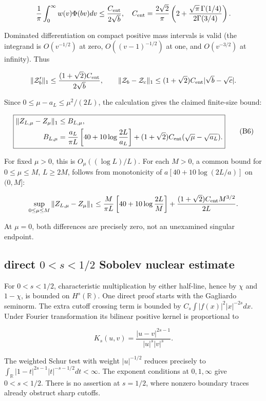 \documentclass[
  10pt,
  a4paper,
]{article}
\begin{document}
\[
\frac1\pi\int_0^\infty w(v)\Phi(bv)dv\le\frac{C_{\rm ent}}{2\sqrt b},\quad
C_{\rm ent}=\frac{2\sqrt2}{\pi}\left(2+\frac{\sqrt\pi\,\Gamma(1/4)}{2\Gamma(3/4)}\right).
\]

Dominated differentiation on compact positive mass intervals is valid (the integrand is \(O(v^{-1/2})\) at zero, \(O((v-1)^{-1/2})\) at one, and \(O(v^{-3/2})\) at infinity). Thus

\[
\|\mathcal Z_b'\|_1\le\frac{(1+\sqrt2)C_{\rm ent}}{2\sqrt b},\qquad
\|\mathcal Z_b-\mathcal Z_c\|_1\le(1+\sqrt2)C_{\rm ent}|\sqrt b-\sqrt c|.
\]

Since \(0\le\mu-a_L\le\mu^2/(2L)\), the calculation gives the claimed finite-size bound:

\[
\boxed{\begin{aligned}
\|Z_{L,\mu}-Z_\mu\|_1&\le B_{L,\mu},\\
B_{L,\mu}&=\frac{a_L}{\pi L}\left[40+10\log\frac{2L}{a_L}\right]
+(1+\sqrt2)C_{\rm ent}(\sqrt\mu-\sqrt{a_L}).
\end{aligned}}\tag{B6}
\]

For fixed \(\mu>0\), this is \(O_\mu((\log L)/L)\). For each \(M>0\), a common bound for \(0\le\mu\le M\), \(L\ge2M\), follows from monotonicity of \(a[40+10\log(2L/a)]\) on \((0,M]\):

\[
\sup_{0\le\mu\le M}\|Z_{L,\mu}-Z_\mu\|_1
\le\frac{M}{\pi L}\left[40+10\log\frac{2L}{M}\right]
+\frac{(1+\sqrt2)C_{\rm ent}M^{3/2}}{2L}.
\]

At \(\mu=0\), both differences are precisely zero, not an unexamined singular endpoint.

\subsection{\texorpdfstring{direct \(0<s<1/2\) Sobolev nuclear estimate}{direct 0\textless s\textless1/2 Sobolev nuclear estimate}}\label{direct-0s12-sobolev-nuclear-estimate}

For \(0<s<1/2\), characteristic multiplication by either half-line, hence by \(\chi\) and \(1-\chi\), is bounded on \(H^s(\mathbb R)\). One direct proof starts with the Gagliardo seminorm. The extra cutoff crossing term is bounded by \(C_s\int|f(x)|^2|x|^{-2s}dx\). Under Fourier transformation its bilinear positive kernel is proportional to

\[
K_s(u,v)=\frac{|u-v|^{2s-1}}{|u|^s|v|^s}.
\]

The weighted Schur test with weight \(|u|^{-1/2}\) reduces precisely to \(\int_{\mathbb R}|1-t|^{2s-1}|t|^{-s-1/2}dt<\infty\). The exponent conditions at \(0,1,\infty\) give \(0<s<1/2\). There is no assertion at \(s=1/2\), where nonzero boundary traces already obstruct sharp cutoffs.
\end{document}

